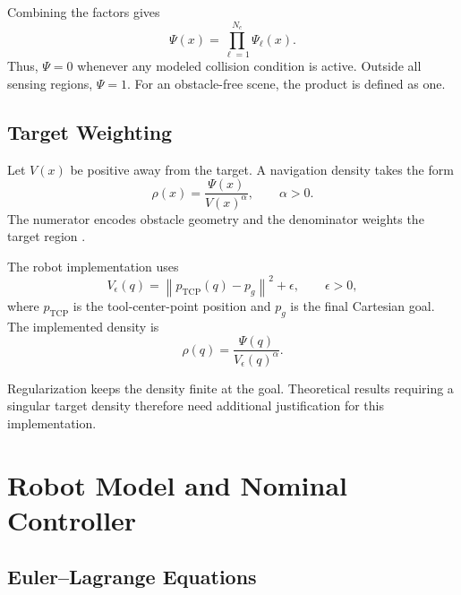 \documentclass[conference]{IEEEtran}
\newcommand{\norm}[1]{\left\lVert#1\right\rVert}
\begin{document}
Combining the factors gives
\begin{equation}
    \Psi(x)=\prod_{\ell=1}^{N_c}\Psi_\ell(x).
    \label{eq:psi}
\end{equation}
Thus, $\Psi=0$ whenever any modeled collision condition
is active. Outside all sensing regions, $\Psi=1$.
For an obstacle-free scene, the product is defined
as one.

\subsection{Target Weighting}

Let $V(x)$ be positive away from the target.
A navigation density takes the form
\begin{equation}
    \rho(x)=\frac{\Psi(x)}{V(x)^\alpha},
    \qquad \alpha>0.
    \label{eq:density}
\end{equation}
The numerator encodes obstacle geometry and the
denominator weights the target region
\cite{moyalan2024synthesizing,moyalan2024robust}.

The robot implementation uses
\begin{equation}
    V_\epsilon(q)=
    \norm{p_{\mathrm{TCP}}(q)-p_g}^2+\epsilon,
    \qquad \epsilon>0,
    \label{eq:target}
\end{equation}
where $p_{\mathrm{TCP}}$ is the tool-center-point
position and $p_g$ is the final Cartesian goal.
The implemented density is
\begin{equation}
    \rho(q)=\frac{\Psi(q)}{V_\epsilon(q)^\alpha}.
    \label{eq:robot-density}
\end{equation}

Regularization keeps the density finite at the goal.
Theoretical results requiring a singular target
density therefore need additional justification
for this implementation.

\section{Robot Model and Nominal Controller}
\label{sec:robot}

\subsection{Euler--Lagrange Equations}
\end{document}
